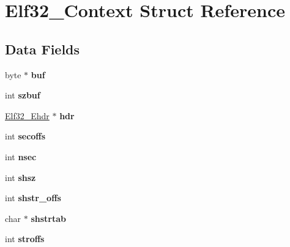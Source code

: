 \hypertarget{structElf32__Context}{\section{Elf32\-\_\-\-Context Struct Reference}
\label{structElf32__Context}
}
\subsection*{Data Fields}
\begin{DoxyCompactItemize}
\item 
\hypertarget{structElf32__Context_a7a42d8ffd3e9658166493a441e381b0e}{byte $\ast$ {\bfseries buf}}\label{structElf32__Context_a7a42d8ffd3e9658166493a441e381b0e}

\item 
\hypertarget{structElf32__Context_adc1085bc32d3b3d06ca3a684f60a66dd}{int {\bfseries szbuf}}\label{structElf32__Context_adc1085bc32d3b3d06ca3a684f60a66dd}

\item 
\hypertarget{structElf32__Context_ae314deb4d289b9108654aaa116697164}{\hyperlink{structElf32__Ehdr}{Elf32\-\_\-\-Ehdr} $\ast$ {\bfseries hdr}}\label{structElf32__Context_ae314deb4d289b9108654aaa116697164}

\item 
\hypertarget{structElf32__Context_a504d064c2631e31c574a7500c16848d9}{int {\bfseries secoffs}}\label{structElf32__Context_a504d064c2631e31c574a7500c16848d9}

\item 
\hypertarget{structElf32__Context_a258c54ac0ac93b22ebe827b3f6e471ea}{int {\bfseries nsec}}\label{structElf32__Context_a258c54ac0ac93b22ebe827b3f6e471ea}

\item 
\hypertarget{structElf32__Context_a5f931563bb674468dbab9d898b71b648}{int {\bfseries shsz}}\label{structElf32__Context_a5f931563bb674468dbab9d898b71b648}

\item 
\hypertarget{structElf32__Context_a10d4425c90167cb43d6a2dbfbf6153bd}{int {\bfseries shstr\-\_\-offs}}\label{structElf32__Context_a10d4425c90167cb43d6a2dbfbf6153bd}

\item 
\hypertarget{structElf32__Context_a753b8a1251f1a68c6a103516808a4da5}{char $\ast$ {\bfseries shstrtab}}\label{structElf32__Context_a753b8a1251f1a68c6a103516808a4da5}

\item 
\hypertarget{structElf32__Context_ab89e2fa4874340ee810a4f096ee9ca54}{int {\bfseries stroffs}}\label{structElf32__Context_ab89e2fa4874340ee810a4f096ee9ca54}


\end{DoxyCompactItemize}
